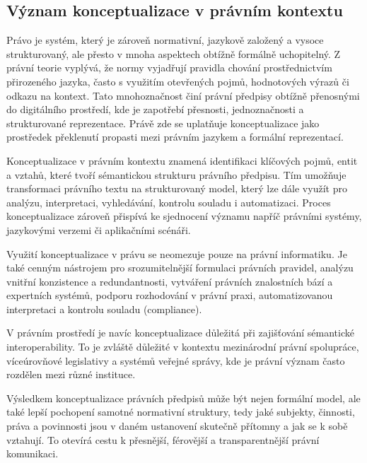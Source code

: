 
\subsection{Význam konceptualizace v právním kontextu}
\label{sec:význam-konceptualizace-v-právním-kontextu}
Právo je systém, který je zároveň normativní, jazykově založený a vysoce strukturovaný, ale přesto v mnoha aspektech obtížně formálně uchopitelný. Z právní teorie vyplývá, že normy vyjadřují pravidla chování prostřednictvím přirozeného jazyka, často s využitím otevřených pojmů, hodnotových výrazů či odkazu na kontext. Tato mnohoznačnost činí právní předpisy obtížně přenosnými do digitálního prostředí, kde je zapotřebí přesnosti, jednoznačnosti a strukturované reprezentace. Právě zde se uplatňuje konceptualizace jako prostředek překlenutí propasti mezi právním jazykem a formální reprezentací. \cite{Sarsfield2020,Cotterrell2006}

Konceptualizace v právním kontextu znamená identifikaci klíčových pojmů, entit a vztahů, které tvoří sémantickou strukturu právního předpisu. Tím umožňuje transformaci právního textu na strukturovaný model, který lze dále využít pro analýzu, interpretaci, vyhledávání, kontrolu souladu i automatizaci. Proces konceptualizace zároveň přispívá ke sjednocení významu napříč právními systémy, jazykovými verzemi či aplikačními scénáři. \cite{Cotterrell2006}

Využití konceptualizace v právu se neomezuje pouze na právní informatiku. Je také cenným nástrojem pro srozumitelnější formulaci právních pravidel, analýzu vnitřní konzistence a redundantnosti, vytváření právních znalostních bází a expertních systémů, podporu rozhodování v právní praxi, automatizovanou interpretaci a kontrolu souladu (compliance). \cite{Bajcic2011, Horak}

V právním prostředí je navíc konceptualizace důležitá při zajišťování sémantické interoperability. To je zvláště důležité v kontextu mezinárodní právní spolupráce, víceúrovňové legislativy a systémů veřejné správy, kde je právní význam často rozdělen mezi různé instituce. \cite{Cotterrell2006,Bajcic2011}

Výsledkem konceptualizace právních předpisů může být nejen formální model, ale také lepší pochopení samotné normativní struktury, tedy jaké subjekty, činnosti, práva a povinnosti jsou v daném ustanovení skutečně přítomny a jak se k sobě vztahují. To otevírá cestu k přesnější, férovější a transparentnější právní komunikaci. \cite{Horak20211}

